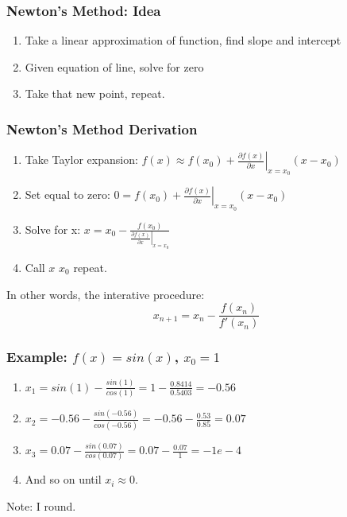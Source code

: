 \documentclass{beamer}
\begin{document}
\begin{frame}
\frametitle[alignment=center]{Newton's Method: Idea}
\begin{enumerate}
\item  Take a linear approximation of function, find slope and intercept
\bigskip
\item Given equation of line, solve for zero
\bigskip
\item Take that new point, repeat.
\end{enumerate}
\end{frame}

\begin{frame}
\frametitle[alignment=center]{Newton's Method Derivation}
\begin{enumerate}
\item  Take Taylor expansion: $f(x)\approx f(x_0) + \left.\frac{\partial f(x)}{\partial x}\right|_{x=x_0}(x-x_0)$
\item  Set equal to zero: $0= f(x_0) + \left.\frac{\partial f(x)}{\partial x}\right|_{x=x_0}(x-x_0)$
\item  Solve for x: $x= x_0-\frac{f(x_0)}{\left.\frac{\partial f(x)}{\partial x}\right|_{x=x_0}} $
\item Call $x$ $x_0$ repeat. 
\end{enumerate}
In other words, the interative procedure:
$$x_{n+1}=x_n-\frac{f(x_n)}{f'(x_n)}$$
\end{frame}

\begin{frame}
\frametitle[alignment=center]{Example: $f(x)=sin(x)$, $x_0=1$}
\begin{enumerate}
\item  $x_1=sin(1)-\frac{sin(1)}{cos(1)}=1-\frac{0.8414}{0.5403}=-0.56$
\bigskip
\item  $x_2=-0.56-\frac{sin(-0.56)}{cos(-0.56)}=-0.56-\frac{0.53}{0.85}=0.07$
\bigskip
\item  $x_3=0.07-\frac{sin(0.07)}{cos(0.07)}=0.07-\frac{0.07}{1}=-1e-4$
\bigskip
\item And so on until $x_i\approx 0$.
\bigskip
\end{enumerate}
Note: I round.
\end{frame}
\end{document}
